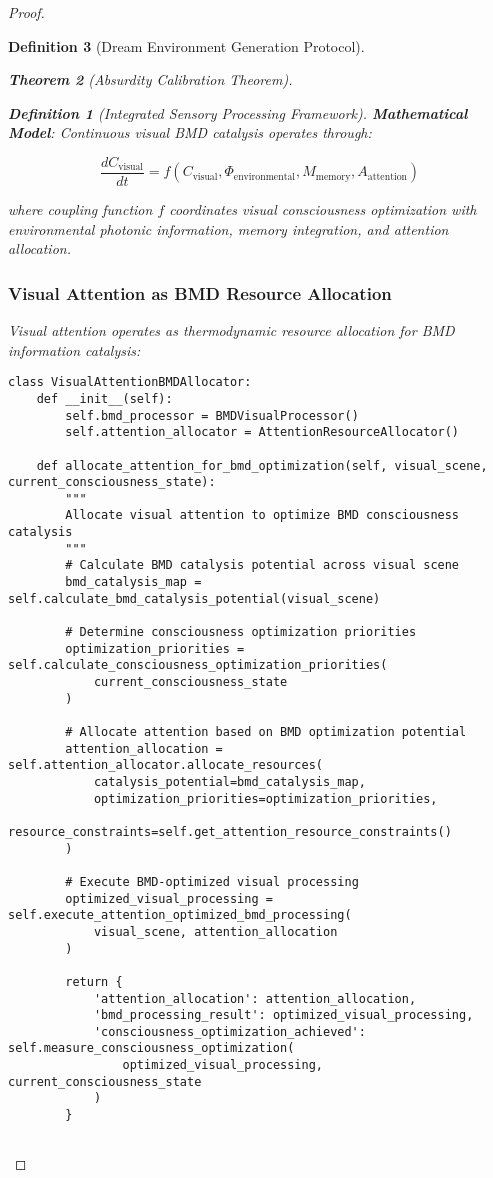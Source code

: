 \documentclass[12pt,a4paper]{article}
\newtheorem{theorem}{Theorem}[section]
\newtheorem{definition}[theorem]{Definition}
\begin{document}
\begin{proof}
\begin{definition}[Dream Environment Generation Protocol]
\begin{theorem}[Absurdity Calibration Theorem]
\begin{observation}
\begin{definition}[Integrated Sensory Processing Framework]
\textbf{Mathematical Model}:
Continuous visual BMD catalysis operates through:

$$\frac{dC_{\text{visual}}}{dt} = f(C_{\text{visual}}, \Phi_{\text{environmental}}, M_{\text{memory}}, A_{\text{attention}})$$

where coupling function $f$ coordinates visual consciousness optimization with environmental photonic information, memory integration, and attention allocation.

\subsubsection{Visual Attention as BMD Resource Allocation}

Visual attention operates as thermodynamic resource allocation for BMD information catalysis:

\begin{lstlisting}[style=pythonstyle, caption=Visual Attention BMD Resource Allocation]
class VisualAttentionBMDAllocator:
    def __init__(self):
        self.bmd_processor = BMDVisualProcessor()
        self.attention_allocator = AttentionResourceAllocator()
        
    def allocate_attention_for_bmd_optimization(self, visual_scene, current_consciousness_state):
        """
        Allocate visual attention to optimize BMD consciousness catalysis
        """
        # Calculate BMD catalysis potential across visual scene
        bmd_catalysis_map = self.calculate_bmd_catalysis_potential(visual_scene)
        
        # Determine consciousness optimization priorities
        optimization_priorities = self.calculate_consciousness_optimization_priorities(
            current_consciousness_state
        )
        
        # Allocate attention based on BMD optimization potential
        attention_allocation = self.attention_allocator.allocate_resources(
            catalysis_potential=bmd_catalysis_map,
            optimization_priorities=optimization_priorities,
            resource_constraints=self.get_attention_resource_constraints()
        )
        
        # Execute BMD-optimized visual processing
        optimized_visual_processing = self.execute_attention_optimized_bmd_processing(
            visual_scene, attention_allocation
        )
        
        return {
            'attention_allocation': attention_allocation,
            'bmd_processing_result': optimized_visual_processing,
            'consciousness_optimization_achieved': self.measure_consciousness_optimization(
                optimized_visual_processing, current_consciousness_state
            )
        }
    

\end{lstlisting}
\end{definition}
\end{observation}
\end{theorem}
\end{definition}
\end{proof}
\end{document}
